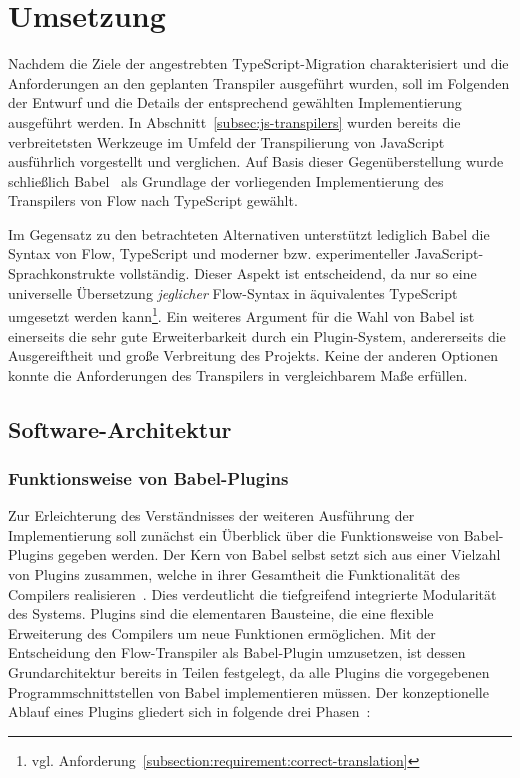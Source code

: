 \chapter{Umsetzung}

Nachdem die Ziele der angestrebten TypeScript-Migration charakterisiert und die Anforderungen an den geplanten Transpiler ausgeführt wurden, soll im Folgenden der Entwurf und die Details der entsprechend gewählten Implementierung ausgeführt werden.
In Abschnitt~\ref{subsec:js-transpilers} wurden bereits die verbreitetsten Werkzeuge im Umfeld der Transpilierung von JavaScript ausführlich vorgestellt und verglichen. Auf Basis dieser Gegenüberstellung wurde schließlich Babel~\autocite{BABEL} als Grundlage der vorliegenden Implementierung des Transpilers von Flow nach TypeScript gewählt.

Im Gegensatz zu den betrachteten Alternativen unterstützt lediglich Babel die Syntax von Flow, TypeScript und moderner bzw. experimenteller JavaScript-Sprachkonstrukte vollständig. Dieser Aspekt ist entscheidend, da nur so eine universelle Übersetzung \emph{jeglicher} Flow-Syntax in äquivalentes TypeScript umgesetzt werden kann\footnote{vgl. Anforderung~\ref{subsection:requirement:correct-translation}}. Ein weiteres Argument für die Wahl von Babel ist einerseits die sehr gute Erweiterbarkeit durch ein Plugin-System, andererseits die Ausgereiftheit und große Verbreitung des Projekts. Keine der anderen Optionen konnte die Anforderungen des Transpilers in vergleichbarem Maße erfüllen.

\section{Software-Architektur}

\subsection{Funktionsweise von Babel-Plugins}

Zur Erleichterung des Verständnisses der weiteren Ausführung der Implementierung soll zunächst ein Überblick über die Funktionsweise von Babel-Plugins gegeben werden. Der Kern von Babel selbst setzt sich aus einer Vielzahl von Plugins zusammen, welche in ihrer Gesamtheit die Funktionalität des Compilers realisieren~\autocite{BABEL}. Dies verdeutlicht die tiefgreifend integrierte Modularität des Systems. Plugins sind die elementaren Bausteine, die eine flexible Erweiterung des Compilers um neue Funktionen ermöglichen.
Mit der Entscheidung den Flow-Transpiler als Babel-Plugin umzusetzen, ist dessen Grundarchitektur bereits in Teilen festgelegt, da alle Plugins die vorgegebenen Programmschnittstellen von Babel implementieren müssen. Der konzeptionelle Ablauf eines Plugins gliedert sich in folgende drei Phasen~\autocite{BABEL_HANDBOOK}:

